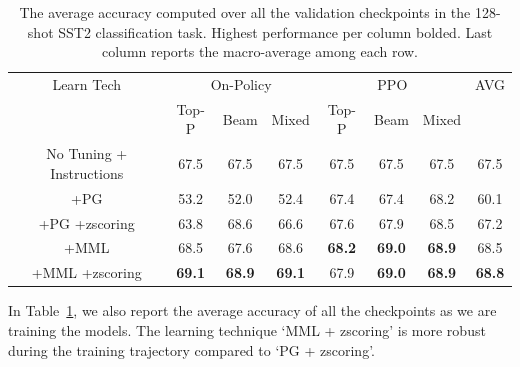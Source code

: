 \documentclass[11pt]{article}
\begin{document}
\begin{table}
\centering
\caption{The average accuracy computed over all the validation checkpoints in the 128-shot SST2 classification task. Highest performance per column bolded. Last column reports the macro-average among each row.}
\begin{tabular}{ c | c c c | c c c | c}
\hline

Learn Tech & \multicolumn{3}{c|}{On-Policy} & \multicolumn{3}{c|}{PPO} & AVG \\
 & \small{Top-P} & \small{Beam} & \small{Mixed} & \small{Top-P} & \small{Beam} & \small{Mixed} & \\
\hline
No Tuning \small + Instructions & \small67.5 & \small67.5 & \small67.5 & \small67.5 & \small67.5 & \small67.5 & \small67.5\\
\hline
+PG & \small 53.2 & \small 52.0 & \small 52.4 & \small 67.4 & \small 67.4 & \small 68.2 & \small 60.1 \\
+PG \small +zscoring & \small 63.8 & \small 68.6 & \small 66.6 & \small 67.6 & \small 67.9 & \small 68.5 & \small 67.2 \\
\hline
+MML& \small 68.5 & \small 67.6 & \small 68.6 & \small \textbf{68.2} & \small \textbf{69.0} & \small \textbf{68.9} & \small 68.5 \\
+MML \small +zscoring & \small \textbf{69.1} & \small \textbf{68.9} & \small \textbf{69.1} & \small 67.9 & \small \textbf{69.0} & \small \textbf{68.9} & \small \textbf{68.8} \\
\hline
\end{tabular}
\label{average-curves-on-ppo}
\end{table}

In Table~\ref{average-curves-on-ppo}, we also report the average accuracy of all the checkpoints as we are training the models. The learning technique `MML {\small + zscoring}' is more robust during the training trajectory compared to `PG {\small + zscoring}'.
\end{document}
